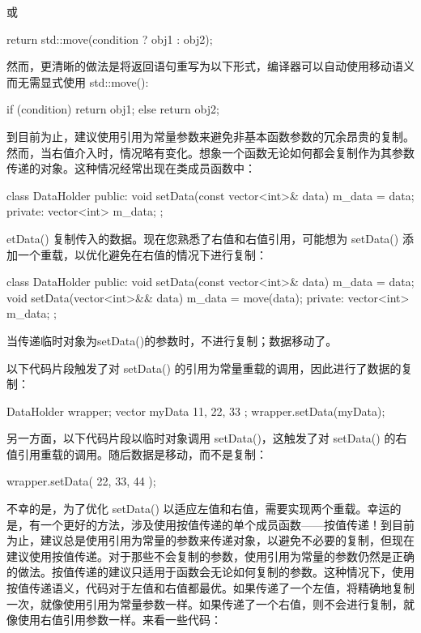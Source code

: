 或

\begin{cpp}
return std::move(condition ? obj1 : obj2);
\end{cpp}

然而，更清晰的做法是将返回语句重写为以下形式，编译器可以自动使用移动语义而无需显式使用 std::move():

\begin{cpp}
if (condition) {
    return obj1;
} else {
    return obj2;
}
\end{cpp}


到目前为止，建议使用引用为常量参数来避免非基本函数参数的冗余昂贵的复制。然而，当右值介入时，情况略有变化。想象一个函数无论如何都会复制作为其参数传递的对象。这种情况经常出现在类成员函数中：

\begin{cpp}
class DataHolder
{
    public:
        void setData(const vector<int>& data) { m_data = data; }
    private:
        vector<int> m_data;
};
\end{cpp}

etData() 复制传入的数据。现在您熟悉了右值和右值引用，可能想为 setData() 添加一个重载，以优化避免在右值的情况下进行复制：

\begin{cpp}
class DataHolder
{
    public:
        void setData(const vector<int>& data) { m_data = data; }
        void setData(vector<int>&& data) { m_data = move(data); }
    private:
        vector<int> m_data;
};
\end{cpp}

当传递临时对象为setData()的参数时，不进行复制；数据移动了。

以下代码片段触发了对 setData() 的引用为常量重载的调用，因此进行了数据的复制：

\begin{cpp}
DataHolder wrapper;
vector myData { 11, 22, 33 };
wrapper.setData(myData);
\end{cpp}

另一方面，以下代码片段以临时对象调用 setData()，这触发了对 setData() 的右值引用重载的调用。随后数据是移动，而不是复制：

\begin{cpp}
wrapper.setData({ 22, 33, 44 });
\end{cpp}

不幸的是，为了优化 setData() 以适应左值和右值，需要实现两个重载。幸运的是，有一个更好的方法，涉及使用按值传递的单个成员函数——按值传递！到目前为止，建议总是使用引用为常量的参数来传递对象，以避免不必要的复制，但现在建议使用按值传递。对于那些不会复制的参数，使用引用为常量的参数仍然是正确的做法。按值传递的建议只适用于函数会无论如何复制的参数。这种情况下，使用按值传递语义，代码对于左值和右值都最优。如果传递了一个左值，将精确地复制一次，就像使用引用为常量参数一样。如果传递了一个右值，则不会进行复制，就像使用右值引用参数一样。来看一些代码：

